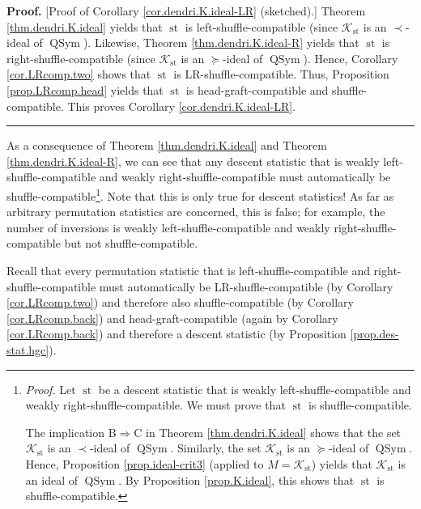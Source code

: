 \documentclass[numbers=enddot,12pt,final,onecolumn,notitlepage]{scrartcl}%
\theoremstyle{definition}
\newenvironment{proof}[1][Proof]{\noindent\textbf{#1.} }{\ \rule{0.5em}{0.5em}}
\newenvironment{verlong}{}{}
\begin{document}
\begin{verlong}
\begin{proof}
[Proof of Corollary \ref{cor.dendri.K.ideal-LR} (sketched).] Theorem
\ref{thm.dendri.K.ideal} yields that $\operatorname*{st}$ is
left-shuffle-compatible (since $\mathcal{K}_{\operatorname*{st}}$ is an
$\left.  \prec\right.  $-ideal of $\operatorname*{QSym}$). Likewise, Theorem
\ref{thm.dendri.K.ideal-R} yields that $\operatorname*{st}$ is
right-shuffle-compatible (since $\mathcal{K}_{\operatorname*{st}}$ is an
$\left.  \succeq\right.  $-ideal of $\operatorname*{QSym}$). Hence, Corollary
\ref{cor.LRcomp.two} shows that $\operatorname*{st}$ is LR-shuffle-compatible.
Thus, Proposition \ref{prop.LRcomp.head} yields that $\operatorname*{st}$ is
head-graft-compatible and shuffle-compatible. This proves Corollary
\ref{cor.dendri.K.ideal-LR}.
\end{proof}

As a consequence of Theorem \ref{thm.dendri.K.ideal} and Theorem
\ref{thm.dendri.K.ideal-R}, we can see that any descent statistic that is
weakly left-shuffle-compatible and weakly right-shuffle-compatible must
automatically be shuffle-compatible\footnote{\textit{Proof.} Let
$\operatorname*{st}$ be a descent statistic that is weakly
left-shuffle-compatible and weakly right-shuffle-compatible. We must prove
that $\operatorname*{st}$ is shuffle-compatible.
\par
The implication B$\Longrightarrow$C in Theorem \ref{thm.dendri.K.ideal} shows
that the set $\mathcal{K}_{\operatorname*{st}}$ is an $\left.  \prec\right.
$-ideal of $\operatorname*{QSym}$. Similarly, the set $\mathcal{K}%
_{\operatorname*{st}}$ is an $\left.  \succeq\right.  $-ideal of
$\operatorname*{QSym}$. Hence, Proposition \ref{prop.ideal-crit3} (applied to
$M=\mathcal{K}_{\operatorname*{st}}$) yields that $\mathcal{K}%
_{\operatorname*{st}}$ is an ideal of $\operatorname*{QSym}$. By Proposition
\ref{prop.K.ideal}, this shows that $\operatorname*{st}$ is
shuffle-compatible.}. Note that this is only true for descent statistics! As
far as arbitrary permutation statistics are concerned, this is false; for
example, the number of inversions is weakly left-shuffle-compatible and weakly
right-shuffle-compatible but not shuffle-compatible.

Recall that every permutation statistic that is left-shuffle-compatible and
right-shuffle-compatible must automatically be LR-shuffle-compatible (by
Corollary \ref{cor.LRcomp.two}) and therefore also shuffle-compatible (by
Corollary \ref{cor.LRcomp.back}) and head-graft-compatible (again by Corollary
\ref{cor.LRcomp.back}) and therefore a descent statistic (by Proposition
\ref{prop.des-stat.hgc}).


\end{verlong}
\end{document}
